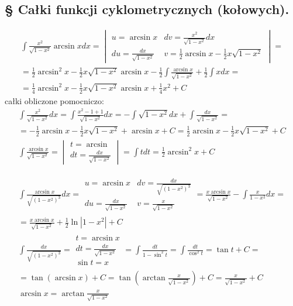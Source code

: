 \subsection{§ Całki funkcji cyklometrycznych (kołowych).}


\begin{gather*}\int \frac{x^2}{\sqrt{1-x^2}}\arcsin x dx = \begin{vmatrix}
u=\arcsin x & dv=\frac{x^2}{\sqrt{1-x^2}}dx \\
du=\frac{dx}{\sqrt{1-x^2}} &  v=\frac{1}{2}\arcsin x - \frac{1}{2}x\sqrt{1-x^2}
\end{vmatrix} =  \\
= \frac{1}{2}\arcsin^2 x - \frac{1}{2}x\sqrt{1-x^2}\arcsin x - \frac{1}{2}\int \frac{\arcsin x}{\sqrt{1-x^2}} + \frac{1}{2}\int xdx = \\
= \frac{1}{4}\arcsin^2 x - \frac{1}{2}x\sqrt{1-x^2}\arcsin x + \frac{1}{4}x^2 + C\end{gather*}
całki obliczone pomocniczo:
\begin{gather*}\int \frac{x^2}{\sqrt{1-x^2}}dx = \int \frac{x^2-1+1}{\sqrt{1-x^2}}dx = -\int \sqrt{1-x^2}dx+\int \frac{dx}{\sqrt{1-x^2}} =  \\
= -\frac{1}{2}\arcsin x - \frac{1}{2}x\sqrt{1-x^2} + \arcsin x + C= \frac{1}{2}\arcsin x - \frac{1}{2}x\sqrt{1-x^2}+C \\
\int \frac{\arcsin x}{\sqrt{1-x^2}} = \begin{vmatrix} t=\arcsin \\ dt=\frac{dx}{\sqrt{1-x^2}}\end{vmatrix} = \int tdt = \frac{1}{2}\arcsin^2 x +C\end{gather*}



\begin{gather*}\int \frac{\arcsin x}{\sqrt{(1-x^2)^3}} dx = \begin{array}{|ll|}
u=\arcsin x & dv=\frac{dx}{\sqrt{(1-x^2)^3}} \\
du=\frac{dx}{\sqrt{1-x^2}} & v=\frac{x}{\sqrt{1-x^2}} \end{array} = \frac{x\arcsin x}{\sqrt{1-x^2}} - \int \frac{x}{1-x^2}dx =  \\
= \frac{x\arcsin x}{\sqrt{1-x^2}} + \frac{1}{2}\ln|1-x^2|+C \\
\int \frac{dx}{\sqrt{(1-x^2)^3}} = \begin{array}{|l|} t=\arcsin x \\ dt=\frac{dx}{\sqrt{1-x^2}} \\ \sin t = x \end{array} = \int \frac{dt}{1-\sin^2 t} = \int \frac{dt}{\cos^2 t} = \tan t+C =  \\
= \tan (\arcsin x)+C = \tan(\arctan \frac{x}{\sqrt{1-x^2}})+C = \frac{x}{\sqrt{1-x^2}}+C \\
\nonumber \arcsin x = \arctan \frac{x}{\sqrt{1-x^2}}\end{gather*}



